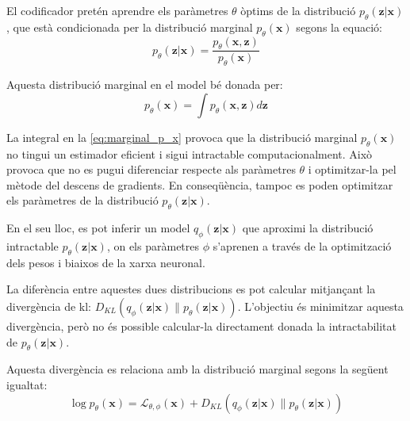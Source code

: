 \documentclass[CAT,BIB]{TFUOC}%
\begin{document}
        El codificador pretén aprendre els paràmetres $\theta$ òptims
        de la distribució $p_\theta(\mathbf{z|x})$,
        que està condicionada per la distribució marginal $p_\theta(\mathbf{x})$
        segons la equació:
        \begin{equation}
        \label{eq:cond_p_z_on_x}
            p_\theta(\mathbf{z|x}) =
            \frac {p_\theta(\mathbf{x,z})}
                  {p_\theta(\mathbf{x})}
        \end{equation}

        Aquesta distribució marginal en el model bé donada per:
        \begin{equation}
        \label{eq:marginal_p_x}
            p_\theta(\mathbf{x}) = \int p_\theta(\mathbf{x, z}) d\mathbf{z}
        \end{equation}

        La integral en la \cref{eq:marginal_p_x} provoca que
        la distribució marginal $p_\theta(\mathbf{x})$ no tingui un estimador eficient
        i sigui intractable computacionalment.
        Això provoca que no es pugui diferenciar respecte als paràmetres $\theta$
        i optimitzar-la pel mètode del descens de gradients.
        En conseqüència,
        tampoc es poden optimitzar els paràmetres de la distribució $p_\theta(\mathbf{z|x})$.

        En el seu lloc,
        es pot inferir un model $q_\phi(\mathbf{z|x})$
        que aproximi la distribució intractable $p_\theta(\mathbf{z|x})$,
        on els paràmetres $\phi$ s'aprenen a través de la optimització
        dels pesos i biaixos de la xarxa neuronal.

        La diferència entre aquestes dues distribucions
        es pot calcular mitjançant la divergència de \gls{kl}:
        $D_{KL} ( q_\phi(\mathbf{z|x}) \| p_\theta(\mathbf{z|x}) )$.
        L'objectiu és minimitzar aquesta divergència,
        però no és possible calcular-la directament
        donada la intractabilitat de $p_\theta(\mathbf{z|x})$.

        Aquesta divergència es relaciona amb la distribució marginal
        segons la següent igualtat:
        \begin{equation}
            \label{eq:kl}
            \log p_\theta(\mathbf{x}) =
            \mathcal{L}_{\theta,\phi}(\mathbf{x}) +
            D_{KL} (
            q_\phi(\mathbf{z|x}) \|
            p_\theta(\mathbf{z|x})
            )
        \end{equation}
\end{document}
